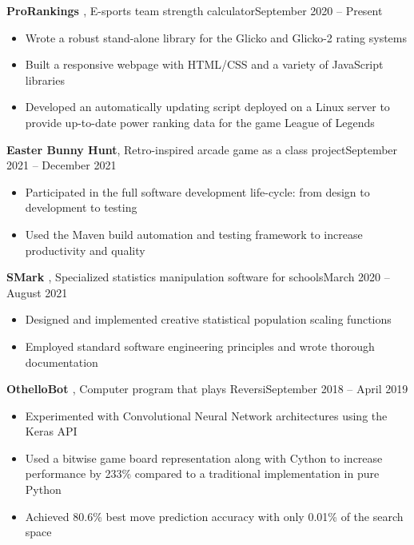 \documentclass{article}
\newcommand{\entrytitle}[3]{\vspace{0.5em}\textbf{#1}, #2\hfill #3}
\newenvironment{entrybody}{\begin{itemize}[itemsep=0.3em]}{\end{itemize}}
\begin{document}
\entrytitle{ProRankings \href{https://github.com/xtevenx/ProRankings}{\faGithub}} %
    {E-sports team strength calculator}{September 2020 – Present}
\begin{entrybody}
\item Wrote a robust stand-alone library for the Glicko and Glicko-2 rating systems
\item Built a responsive webpage with HTML/CSS and a variety of JavaScript libraries
\item
    Developed an automatically updating script deployed on a Linux server to provide up-to-date
    power ranking data for the game League of Legends
\end{entrybody}

\entrytitle{Easter Bunny Hunt} %
    {Retro-inspired arcade game as a class project}{September 2021 – December 2021}
\begin{entrybody}
\item Participated in the full software development life-cycle: from design to development to testing
\item Used the Maven build automation and testing framework to increase productivity and quality
\end{entrybody}

\entrytitle{SMark \href{https://github.com/xtevenx/SMark}{\faGithub}} %
    {Specialized statistics manipulation software for schools}{March 2020 – August 2021}
\begin{entrybody}
\item Designed and implemented creative statistical population scaling functions
\item Employed standard software engineering principles and wrote thorough documentation
\end{entrybody}

\entrytitle{OthelloBot \href{https://github.com/xtevenx/othello-bot}{\faGithub}} %
    {Computer program that plays Reversi}{September 2018 – April 2019}
\begin{entrybody}
\item Experimented with Convolutional Neural Network architectures using the Keras API
\item  %
    Used a bitwise game board representation along with Cython to increase performance by 233\%
    compared to a traditional implementation in pure Python
\item  %
    Achieved 80.6\% best move prediction accuracy with only 0.01\% of the search space
\end{entrybody}
\end{document}

